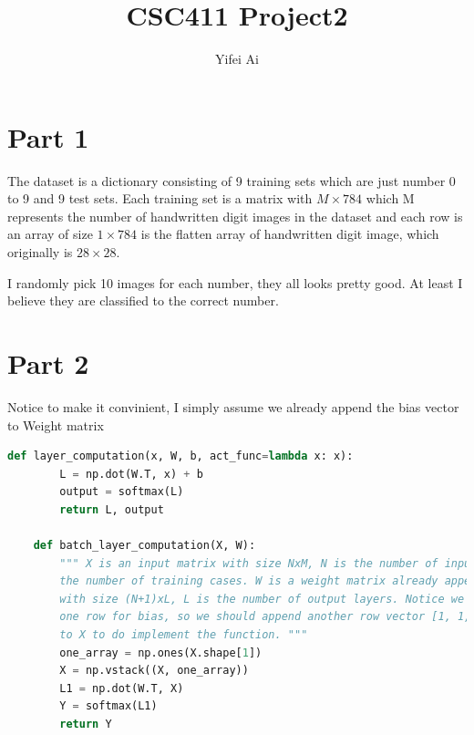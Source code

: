 \documentclass[12pt]{article}
\begin{document}
\title{CSC411 Project2}
\author{Yifei Ai}
\date{}
\maketitle
\section*{Part 1}
The dataset is a dictionary consisting of 9 training sets which are just number 0 to 9 and 9 test sets. Each training set is a matrix with $M\times 784$ which M represents the number of handwritten digit images in the dataset and each row is an array of size $1\times 784$ is the flatten array of handwritten digit image, which originally is $28\times 28$.

I randomly pick 10 images for each number, they all looks pretty good. At least I believe they are classified to the correct number.

\section*{Part 2}
Notice to make it convinient, I simply assume we already append the bias vector to Weight matrix
\begin{lstlisting}[language=Python]
    def layer_computation(x, W, b, act_func=lambda x: x):
        L = np.dot(W.T, x) + b
      	output = softmax(L)
      	return L, output

    def batch_layer_computation(X, W):
        """ X is an input matrix with size NxM, N is the number of input units, M is
        the number of training cases. W is a weight matrix already append bias vector 
        with size (N+1)xL, L is the number of output layers. Notice we need extra 
        one row for bias, so we should append another row vector [1, 1, 1, 1, ... ,1] 
        to X to do implement the function. """
        one_array = np.ones(X.shape[1])
        X = np.vstack((X, one_array))
        L1 = np.dot(W.T, X)
        Y = softmax(L1)
        return Y
\end{lstlisting}

\end{document}
